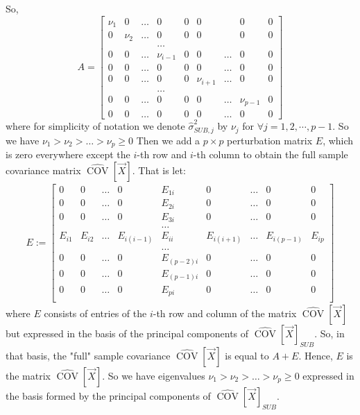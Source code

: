 \documentclass[12pt]{amsart}
\theoremstyle{definition}
\DeclareMathOperator{\Cov}{COV}
\numberwithin{equation}{section}
\numberwithin{equation}{section}
\theoremstyle{remark}
\numberwithin{equation}{section}
\begin{document}
So,
\begin{equation}
A=\left[\begin{array}{ccccccccc}
\nu_1&0&\ldots&0&0&0&&0&0\\
0&\nu_2&\ldots&0&0&0&&0&0\\
&&&\ldots&&&&&\\
0&0&\ldots&\nu_{i-1}&0&0&\ldots&0&0\\
0&0&\ldots&0&0&0&\ldots&0&0\\
0&0&\ldots&0&0&\nu_{i+1}&\ldots&0&0\\
&&&\ldots&&&&&\\
0&0&\ldots&0&0&0&\ldots&\nu_{p-1}&0\\
0&0&\ldots &0&0&0&\ldots&0&0
\end{array}
\right]
\end{equation}
where for simplicity of notation we denote $\hat{\sigma}^2_{SUB,j}$ by $\nu_j$ for $\forall j=1,2,\cdots,p-1$.
So we have $\nu_1>\nu_2>\ldots>\nu_p\geq 0$
Then we add a $p\times p$ perturbation matrix $E$,
which is zero everywhere except the $i$-th row and $i$-th column
to obtain the full sample covariance matrix $\hat{\Cov}[\vec{X}]$. That is let:
\begin{align*}
E:=\left[\begin{array}{ccccccccc}
0&0&\ldots&0&E_{1i}&0&\ldots&0&0\\
0&0&\ldots&0&E_{2i}&0&\ldots&0&0\\
0&0&\ldots&0&E_{3i}&0&\ldots&0&0\\
&&&&\ldots&&&&\\
E_{i1}&E_{i2}&\ldots&E_{i(i-1)}&E_{ii}&E_{i(i+1)}&\ldots&E_{i(p-1)}&E_{ip}\\
&&&&\ldots&&&&\\
0&0&\ldots&0&E_{(p-2)i}&0&\ldots&0&0\\
0&0&\ldots&0&E_{(p-1)i}&0&\ldots&0&0\\
0&0&\ldots&0&E_{pi}&0&\ldots&0&0\\
\end{array}
\right]
\end{align*}
where $E$ consists of entries of the $i$-th row and column of the matrix $\hat{\Cov}[\vec{X}]$ but expressed in the basis of the principal components of $\hat{\Cov}[\vec{X}]_{SUB}$. So, in that basis, the "full" sample covariance $\hat{\Cov}[\vec{X}]$ is equal to $A+E$. Hence, $E$ is the matrix $\hat{\Cov}[\vec{X}]$. So we have eigenvalues $\nu_1>\nu_2>\ldots>\nu_p\geq 0$
expressed in the basis formed by the principal components of $\hat{\Cov}[\vec{X}]_{SUB}$.
\end{document}
